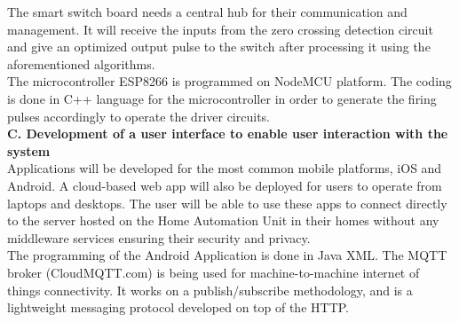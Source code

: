         The smart switch board needs a central hub for their communication and management. It will receive the inputs from the zero crossing detection circuit and give an optimized output pulse to the switch after processing it using the aforementioned algorithms.\\
        
        The microcontroller ESP8266 is programmed on NodeMCU platform. The coding is done in C++ language for the microcontroller in order to generate the firing pulses accordingly to operate the driver circuits.\\
        
        \textbf{C. Development of a user interface to enable user interaction with the system} \\
        
        Applications will be developed for the most common mobile platforms, iOS and Android. A cloud-based web app will also be deployed for users to operate from laptops and desktops. The user will be able to use these apps to connect directly to the server hosted on the Home Automation Unit in their homes without any middleware services ensuring their security and privacy.\\
        
        The programming of the Android Application is done in Java XML. The MQTT broker (CloudMQTT.com) is being used for machine-to-machine internet of things connectivity. It works on a publish/subscribe methodology, and is a lightweight messaging protocol developed on top of the HTTP.\\
        
